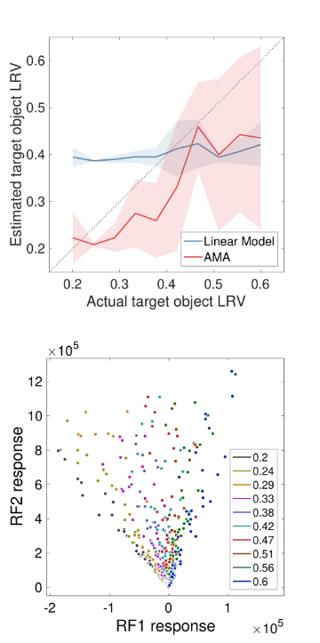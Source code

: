 \documentclass{jov}
\begin{document}
\begin{figure}
\centering
    \begin{subfigure}[b]{0.22\textwidth}   
        \caption{ \newline{}}
        \includegraphics[width=\textwidth, trim={0 0 0 1.5cm},clip]{../FiguresDraft4/Figure11/Figure11_a.pdf}
        \label{fig:case2IsomerizationEstimates}
    \end{subfigure}
        \begin{subfigure}[b]{0.22 \textwidth}
        \caption{ \newline{}}
        \includegraphics[width=\textwidth, trim={0 0 0 1.5cm},clip]{../FiguresDraft4/Figure11/Figure11_b.pdf}

\end{subfigure}
\end{figure}
\end{document}
